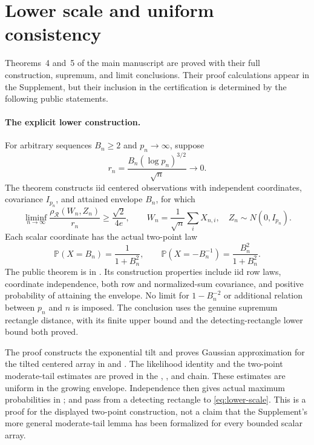 \documentclass[11pt]{article}
\newcommand{\Prob}{\mathbb P}
\begin{document}
\section{Lower scale and uniform consistency}
Theorems~4 and~5 of the main manuscript are proved with their full
construction, supremum, and limit conclusions. Their proof calculations
appear in the Supplement, but their inclusion in the certification is
determined by the following public statements.

\paragraph{The explicit lower construction.}
For arbitrary sequences $B_n\ge2$ and $p_n\to\infty$, suppose
\[
 r_n=\frac{B_n(\log p_n)^{3/2}}{\sqrt n}\longrightarrow0.
\]
The theorem constructs iid centered observations with independent
coordinates, covariance $I_{p_n}$, and attained envelope $B_n$, for
which
\begin{equation}
 \liminf_{n\to\infty}
 \frac{\rho_{\mathcal R}(W_n,Z_n)}{r_n}
 \ge\frac{\sqrt2}{4e},\qquad
 W_n=\frac1{\sqrt n}\sum_iX_{n,i},\quad Z_n\sim N(0,I_{p_n}).
 \label{eq:lower-scale}
\end{equation}
Each scalar coordinate has the actual two-point law
\[
 \Prob(X=B_n)=\frac1{1+B_n^2},\qquad
 \Prob(X=-B_n^{-1})=\frac{B_n^2}{1+B_n^2}.
\]
The public theorem is  in
. Its construction properties include iid row
laws, coordinate independence, both row and normalized-sum covariance,
and positive probability of attaining the envelope. No limit for
$1-B_n^{-2}$ or additional relation between $p_n$ and $n$ is imposed.
The conclusion uses the genuine supremum rectangle distance, with its
finite upper bound and the detecting-rectangle lower bound both proved.

The proof constructs the exponential tilt and proves Gaussian
approximation for the tilted centered array in
 and .
The likelihood identity and the two-point moderate-tail estimates are
proved in the ,
, and  chain.
These estimates are uniform in the growing envelope. Independence then
gives actual maximum probabilities in ;
 and  pass from a
detecting rectangle to \eqref{eq:lower-scale}. This is a proof for the
displayed two-point construction, not a claim that the Supplement's
more general moderate-tail lemma has been formalized for every bounded
scalar array.
\end{document}

